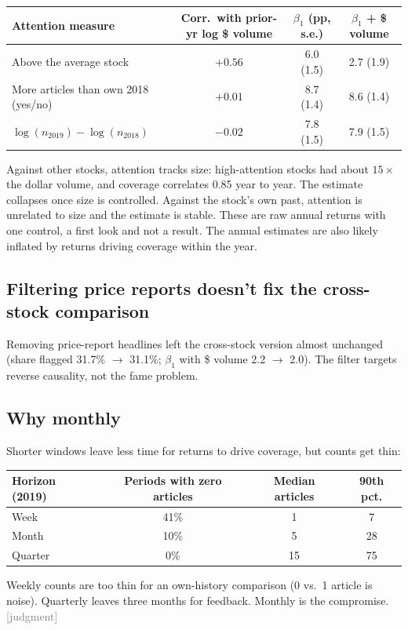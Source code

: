 \documentclass[11pt]{article}
\newcommand{\judg}{\textcolor{Gray}{\textsf{[judgment]}}}
\begin{document}
\begin{center}\small
\begin{tabular}{lccc}
\toprule
Attention measure & Corr.\ with prior-yr log \$ volume & $\beta_1$ (pp, s.e.) & $\beta_1$ + \$ volume\\
\midrule
Above the average stock & $+0.56$ & 6.0 (1.5) & 2.7 (1.9)\\
More articles than own 2018 (yes/no) & $+0.01$ & 8.7 (1.4) & 8.6 (1.4)\\
$\log(n_{2019}) - \log(n_{2018})$ & $-0.02$ & 7.8 (1.5) & 7.9 (1.5)\\
\bottomrule
\end{tabular}
\end{center}
Against other stocks, attention tracks size: high-attention stocks had about $15\times$ the dollar volume, and coverage correlates 0.85 year to year. The estimate collapses once size is controlled. Against the stock's own past, attention is unrelated to size and the estimate is stable. These are raw annual returns with one control, a first look and not a result. The annual estimates are also likely inflated by returns driving coverage within the year.

\subsection{Filtering price reports doesn't fix the cross-stock comparison}
Removing price-report headlines left the cross-stock version almost unchanged (share flagged 31.7\% $\rightarrow$ 31.1\%; $\beta_1$ with \$ volume 2.2 $\rightarrow$ 2.0). The filter targets reverse causality, not the fame problem.

\subsection{Why monthly}
Shorter windows leave less time for returns to drive coverage, but counts get thin:

\begin{center}\small
\begin{tabular}{lccc}
\toprule
Horizon (2019) & Periods with zero articles & Median articles & 90th pct.\\
\midrule
Week & 41\% & 1 & 7\\
Month & 10\% & 5 & 28\\
Quarter & 0\% & 15 & 75\\
\bottomrule
\end{tabular}
\end{center}
Weekly counts are too thin for an own-history comparison (0 vs.\ 1 article is noise). Quarterly leaves three months for feedback. Monthly is the compromise. \judg{}
\end{document}

